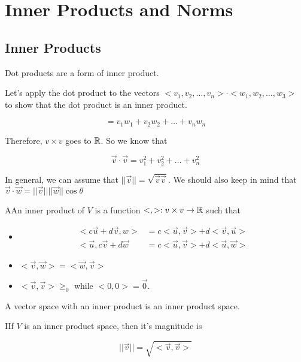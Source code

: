 \section{Inner Products and Norms}

\subsection{Inner Products}

	Dot products are a form of inner product.

	Let's apply the dot product to the vectors $<v_1,v_2,\ldots,v_n>\cdot<w_1,w_2,\ldots,w_3>$ to show that the dot product is an inner product.

	\begin{equation}
		=v_1w_1+v_2w_2+\ldots+v_nw_n
	\end{equation}

	Therefore, $v\times v$ goes to $\mathbb{R}$. So we know that 

	\begin{equation}
		\vec{v}\cdot\vec{v}=v_1^2+v_2^2+\ldots+v_n^2
	\end{equation}

	In general, we can assume that $ | | \vec{v} | | = \sqrt{\vec{v}\vec{v}}$. We should also keep in mind that $\vec{v}\cdot\vec{w}= | | \vec{v} | | | | \vec{w} | | \cos\theta$ 

	\begin{definition}
		AAn inner product of $V$ is a function $<,>:v\times v\to\mathbb{R}$ such that

		\begin{itemize}
			\item\begin{align}
					<c\vec{u}+d\vec{v},w> &= c<\vec{u},\vec{v}>+d<\vec{v},\vec{u}>\\
				<\vec{u},c\vec{v}+d\vec{w}&=c<\vec{u},\vec{v}>+d<\vec{u},\vec{w}>
			\end{align}
			\item $<\vec{v},\vec{w}> = <\vec{w}, \vec{v}>$
			\item $<\vec{v},\vec{v}>\ge_0$ while $<0,0> = \vec{0}$.	
		\end{itemize}
	\end{definition}

	A vector space with an inner product is an inner product space.

	\begin{definition}
		IIf $V$ is an inner product space, then it's magnitude is 
		
		\begin{equation}
			| | \vec{v} | | = \sqrt{<\vec{v},\vec{v}>} 
		\end{equation}
	\end{definition}

